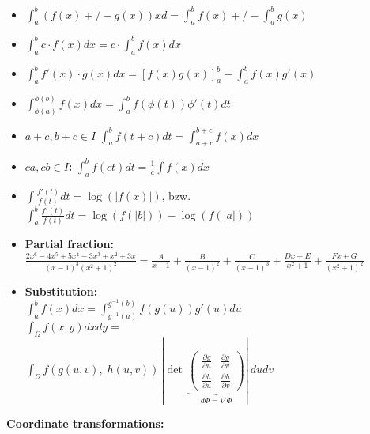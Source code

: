\documentclass[]{article}
\begin{document}
\begin{multicols*}{3}
\begin{itemize}
  \item $\int_a^b (f(x) +/- g(x)) xd = \int_a^b f(x) +/- \int_a^b g(x)$
  \item $\int_a^b c\cdot f(x)dx = c\cdot \int_a^b f(x)dx$
  \item $\int_a^b f'(x)\cdot g(x)dx = \left[f(x)g(x)\right]_a^b - \int_a^b f(x)g'(x)$
  \item $\int_{\phi(a)}^{\phi(b)} f(x)dx = \int_a^b f(\phi(t))\phi '(t) dt$
  \item \textbf{$a+c, b+c \in I$} $\int_a^b f(t+c)dt = \int_{a+c}^{b+c} f(x)dx$
  \item \textbf{$ca,cb\in I$: } $\int_a^b f(ct)dt = \frac{1}{c}\int f(x)dx$
  \item $\int\frac{f'(t)}{f(t)}dt = \log(|f(x)|)$, bzw. $\int_a^b\frac{f'(t)}{f(t)}dt = \log(f(|b|)) - \log(f(|a|))$
  \item \textbf{Partial fraction:}\\
  $\frac{2x^6-4x^5+5x^4-3x^3+x^2+3x}{(x-1)^3(x^2+1)^2} = \frac{A}{x-1}+\frac{B}{(x-1)^2}+\frac{C}{(x-1)^3}+\frac{Dx+E}{x^2+1}+\frac{Fx+G}{(x^2+1)^2}$
  \item \textbf{Substitution:}\\
  $\int_a^b f(x) dx = \int_{g^{-1}(a)}^{g^{-1}(b)} f(g(u)) g'(u) du$\\

  $\int_{\Omega} f(x,y) dx dy=$\\$\int_{\widetilde{\Omega}} f(g(u, v), \; h(u, v)) \, 
		    \left\lvert\det \, \underbrace{\begin{pmatrix}
			    \frac{\partial g}{\partial u} & \frac{\partial g}{\partial v}\\
			    \frac{\partial h}{\partial u} & \frac{\partial h}{\partial v}
		    \end{pmatrix}}_{d\Phi = \nabla\Phi} \right\rvert
	    ~ du dv$
\end{itemize}

\textbf{Coordinate transformations:}


\end{multicols*}
\end{document}
